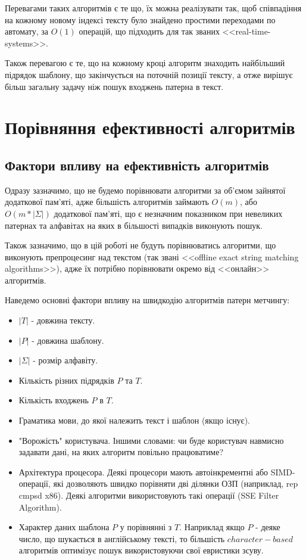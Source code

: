 \documentclass[a4paper,14pt]{extarticle} %
\begin{document}
Перевагами таких алгоритмів є те що, їх можна реалізувати так, щоб співпадіння на кожному новому індексі тексту було знайдено  простими переходами по автомату, за $O(1)$ операцій, що підходить для так званих <<real-time-systems>>.

Також перевагою є те, що на кожному кроці алгоритм знаходить найбільший підрядок шаблону, що закінчується на поточній позиції тексту, а отже вирішує більш загальну задачу ніж пошук входжень патерна в текст.
	\newpage
    \section{Порівняння ефективності алгоритмів}

	\subsection{Фактори впливу на ефективність алгоритмів}

	Одразу зазначимо, що не будемо порівнювати алгоритми за об'ємом зайнятої додаткової пам'яті, адже більшість алгоритмів займають $O(m)$, або $O(m*|\Sigma|)$ додаткової пам'яті, що є незначним показником при невеликих патернах та алфавітах на яких в більшості випадків виконують пошук.
	
	Також зазначимо, що в цій роботі не будуть порівнюватись алгоритми, що виконують препроцесинг над текстом (так звані <<offline exact string matching algorithms>>), адже їх потрібно порівнювати окремо від <<онлайн>> алгоритмів.

	Наведемо основні фактори впливу на швидкодію алгоритмів патерн метчингу:
	\begin{itemize}
		\item $|T|$ - довжина тексту.
		\item $|P|$ - довжина шаблону.
		\item $|\Sigma|$ - розмір алфавіту.
		\item Кількість різних підрядків $P$ та $T$.
		\item Кількість входжень $P$ в $T$.
		\item Граматика мови, до якої належить текст і шаблон (якщо існує).
		\item "Ворожість" користувача. Іншими словами: чи буде користувач навмисно задавати дані, на яких алгоритм повільно працюватиме?
		\item Архітектура процесора. Деякі процесори мають автоінкрементні або SIMD-операції, які дозволяють швидко порівняти дві ділянки ОЗП (наприклад, rep cmpsd x86). Деякі алгоритми використовують такі операції (SSE Filter Algorithm).
		\item Характер даних шаблона $P$ у порівнянні з $T$. Наприклад якщо $P$ - деяке число, що шукається в англійському тексті, то більшість $character-based$ алгоритмів оптимізує пошук використовуючи свої евристики зсуву. 
	\end{itemize}
\end{document}
